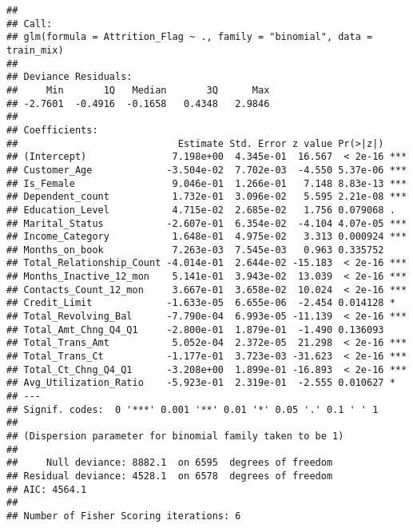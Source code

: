 \documentclass[
]{article}
\newenvironment{Shaded}{\begin{snugshade}}{\end{snugshade}}
\newcommand{\DecValTok}[1]{\textcolor[rgb]{0.00,0.00,0.81}{#1}}
\newcommand{\FloatTok}[1]{\textcolor[rgb]{0.00,0.00,0.81}{#1}}
\newcommand{\FunctionTok}[1]{\textcolor[rgb]{0.00,0.00,0.00}{#1}}
\newcommand{\NormalTok}[1]{#1}
\newcommand{\OtherTok}[1]{\textcolor[rgb]{0.56,0.35,0.01}{#1}}
\newcommand{\SpecialCharTok}[1]{\textcolor[rgb]{0.00,0.00,0.00}{#1}}
\begin{document}
\begin{verbatim}
## 
## Call:
## glm(formula = Attrition_Flag ~ ., family = "binomial", data = train_mix)
## 
## Deviance Residuals: 
##     Min       1Q   Median       3Q      Max  
## -2.7601  -0.4916  -0.1658   0.4348   2.9846  
## 
## Coefficients:
##                            Estimate Std. Error z value Pr(>|z|)    
## (Intercept)               7.198e+00  4.345e-01  16.567  < 2e-16 ***
## Customer_Age             -3.504e-02  7.702e-03  -4.550 5.37e-06 ***
## Is_Female                 9.046e-01  1.266e-01   7.148 8.83e-13 ***
## Dependent_count           1.732e-01  3.096e-02   5.595 2.21e-08 ***
## Education_Level           4.715e-02  2.685e-02   1.756 0.079068 .  
## Marital_Status           -2.607e-01  6.354e-02  -4.104 4.07e-05 ***
## Income_Category           1.648e-01  4.975e-02   3.313 0.000924 ***
## Months_on_book            7.263e-03  7.545e-03   0.963 0.335752    
## Total_Relationship_Count -4.014e-01  2.644e-02 -15.183  < 2e-16 ***
## Months_Inactive_12_mon    5.141e-01  3.943e-02  13.039  < 2e-16 ***
## Contacts_Count_12_mon     3.667e-01  3.658e-02  10.024  < 2e-16 ***
## Credit_Limit             -1.633e-05  6.655e-06  -2.454 0.014128 *  
## Total_Revolving_Bal      -7.790e-04  6.993e-05 -11.139  < 2e-16 ***
## Total_Amt_Chng_Q4_Q1     -2.800e-01  1.879e-01  -1.490 0.136093    
## Total_Trans_Amt           5.052e-04  2.372e-05  21.298  < 2e-16 ***
## Total_Trans_Ct           -1.177e-01  3.723e-03 -31.623  < 2e-16 ***
## Total_Ct_Chng_Q4_Q1      -3.208e+00  1.899e-01 -16.893  < 2e-16 ***
## Avg_Utilization_Ratio    -5.923e-01  2.319e-01  -2.555 0.010627 *  
## ---
## Signif. codes:  0 '***' 0.001 '**' 0.01 '*' 0.05 '.' 0.1 ' ' 1
## 
## (Dispersion parameter for binomial family taken to be 1)
## 
##     Null deviance: 8882.1  on 6595  degrees of freedom
## Residual deviance: 4528.1  on 6578  degrees of freedom
## AIC: 4564.1
## 
## Number of Fisher Scoring iterations: 6
\end{verbatim}

\begin{Shaded}
\end{Shaded}
\end{document}
